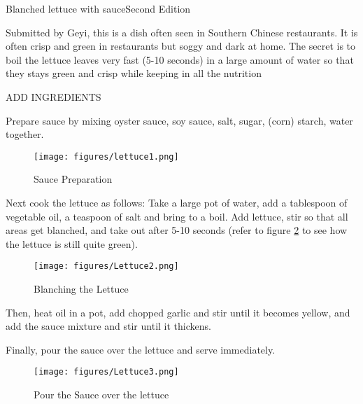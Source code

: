 \begin{entry}{Blanched lettuce with sauce}{Second Edition}

\begin{open}
  Submitted by Geyi, this is a dish often seen in Southern Chinese restaurants. It is often crisp and green in restaurants but soggy and dark at home. The secret is to boil the lettuce leaves very fast (5-10 seconds) in a large amount of water so that they stays green and crisp while keeping in all the nutrition 
\end{open}
\begin{ingredients}

ADD INGREDIENTS

\end{ingredients}
Prepare sauce by mixing oyster sauce, soy sauce, salt, sugar, (corn) starch, water together.

\begin{figure}[h]
    \centering
    \texttt{[image: figures/lettuce1.png]}
    \caption{Sauce Preparation}
    \label{fig:Lettuce1}
\end{figure}

Next cook the lettuce as follows: Take a large pot of water, add a tablespoon of vegetable oil, a teaspoon of salt and bring to a boil. Add lettuce, stir so that all areas get blanched, and take out after 5-10 seconds (refer to figure \ref{fig:lettuce2} to see how the lettuce is still quite green).
 
\begin{figure}
    \centering
    \texttt{[image: figures/Lettuce2.png]}
    \caption{Blanching the Lettuce}
    \label{fig:lettuce2}
\end{figure}
 
Then, heat oil in a pot, add chopped garlic and stir until it becomes yellow, and add the sauce mixture and stir until it thickens. 

Finally, pour the sauce over the lettuce and serve immediately.

\begin{figure}
    \centering
    \texttt{[image: figures/Lettuce3.png]}
    \caption{Pour the Sauce over the lettuce}
    \label{fig:lettuce3}
\end{figure}


\end{entry}

